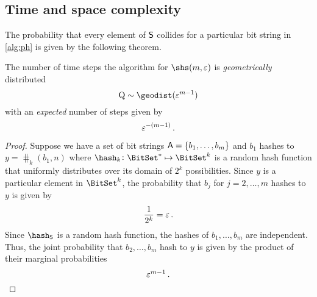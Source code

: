 \documentclass[ ../main.tex]{subfiles}
\begin{document}
\subsection{Time and space complexity}
The probability that every element of $\Set{S}$ collides for a particular bit string in \cref{alg:ph} is given by the following theorem.
\begin{theorem}
The number of time steps the algorithm for $\shs(m,\fprate)$ is \emph{geometrically} distributed
\begin{equation}
	\RV{Q} \sim \geodist(\fprate^{m-1})
\end{equation}
 with an \emph{expected} number of steps given by
\begin{equation}
\label{eq:p_m_N}
	\varepsilon^{-(m-1)}\,.
\end{equation}
\end{theorem}
\begin{proof}
Suppose we have a set of bit strings $\Set{A} = \{b_1,\ldots,b_m\}$ and $b_1$ hashes to $y = \hash_k(b_1,n)$ where $\hash_k \colon \BitSet^{*} \mapsto \BitSet^k$ is a random hash function that uniformly distributes over its domain of $2^k$ possibilities.
Since $y$ is a particular element in $\BitSet^k$, the probability that $b_j$ for $j=2,\ldots,m$ hashes to $y$ is given by
\begin{equation}
    \frac{1}{2^k} = \varepsilon\,.
\end{equation}
Since $\hash_{\Set{S}}$ is a random hash function, the hashes of $b_1,\ldots,b_m$ are independent.
Thus, the joint probability that $b_2, \ldots, b_m$ hash to $y$ is given by the product of their marginal probabilities
\begin{equation}
    \varepsilon^{m-1}\,.
\end{equation}
\end{proof}
\end{document}
